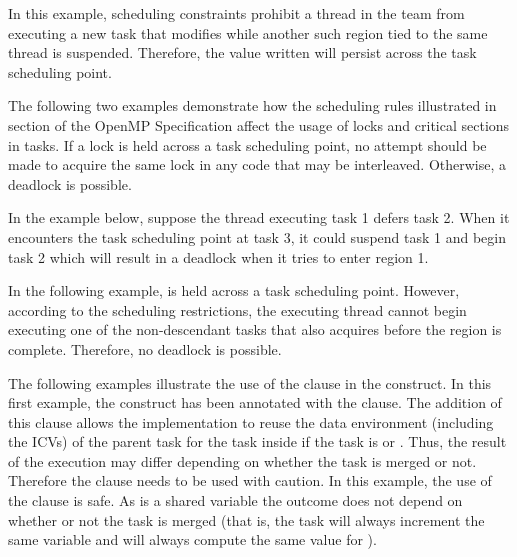 

In this example, scheduling constraints prohibit a thread in the team from executing 
a new task that modifies  while another such  region tied to the 
same thread is suspended. Therefore, the value written will persist across the 
task scheduling point.



The following two examples demonstrate how the scheduling rules illustrated in 
 section of the OpenMP Specification affect the usage of locks
and critical sections in tasks.  If a lock is held 
across a task scheduling point, no attempt should be made to acquire the same lock 
in any code that may be interleaved.  Otherwise, a deadlock is possible.

In the example below, suppose the thread executing task 1 defers task 2.  When 
it encounters the task scheduling point at task 3, it could suspend task 1 and 
begin task 2 which will result in a deadlock when it tries to enter  region 
1.



In the following example,  is held across a task scheduling point. 
 However, according to the scheduling restrictions, the executing thread cannot
begin executing one of the non-descendant tasks that also acquires  before 
the  region is complete.  Therefore, no deadlock is possible.


\clearpage

The following examples illustrate the use of the  clause in the 
 construct. In this first example, the  construct has 
been annotated with the   clause. The addition of this clause 
allows the implementation to reuse the data environment (including the ICVs) of 
the parent task for the task inside  if the task is 
or .
Thus, the result of the execution may differ depending on whether the task is merged 
or not. Therefore the  clause needs to be used with caution. In this example,
the use of the  clause is safe. As  is a shared variable the
outcome does not depend on whether or not the task is merged (that is, the task 
will always increment the same variable and will always compute the same value 
for ).

